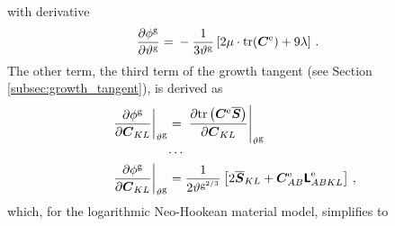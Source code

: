 \documentclass[10pt,letterpaper,oneside]{report}
\newcommand{\ten}[1]{\mbox{\boldmath $#1$}{}}
\newcommand{\tenf}[1]{\mbox{{\sffamily{\bfseries {#1}}}}}
\newcommand{\scas}[1]{\mbox{{\scriptsize{${\rm{#1}}$}}}{}}
\begin{document}
with derivative 
\begin{align}
\frac{\partial \phi^{\scas{g}}}{\partial \vartheta^{\scas{g}}} ={}& - \frac{1}{3 \vartheta^{\scas{g}}} \left[ 2 \mu \cdot \mbox{tr} (\ten{C}^{\scas{e}}) + 9 \lambda \right] \, .
\end{align}
The other term, the third term of the growth tangent (see Section \ref{subsec:growth_tangent}), is derived as
\begin{align}
\left. \frac{ \partial \phi^{\scas{g}} }{ \partial \ten{C}_{KL} } \right|_{\vartheta^{\scas{g}}}  
={}& \left. \frac{ \partial \mbox{tr} \left( \ten{C}^{\scas{e}} \overline{\ten{S}} \right) }{ \partial \ten{C}_{KL} } \right|_{\vartheta^{\scas{g}}} 
\\
\cdots{}& \notag \\
\left. \frac{ \partial \phi^{\scas{g}} }{ \partial \ten{C}_{KL} } \right|_{\vartheta^{\scas{g}}}  
={}& \frac{1}{2 \vartheta^{\scas{g}^{2/3}}}\left[ 2 \overline{\ten{S}}_{KL} + \ten{C}^{\scas{e}}_{AB} \tenf{L}^{\scas{e}}_{ABKL} \right] \, , 
\end{align}
which, for the logarithmic Neo-Hookean material model, simplifies to
\end{document}
